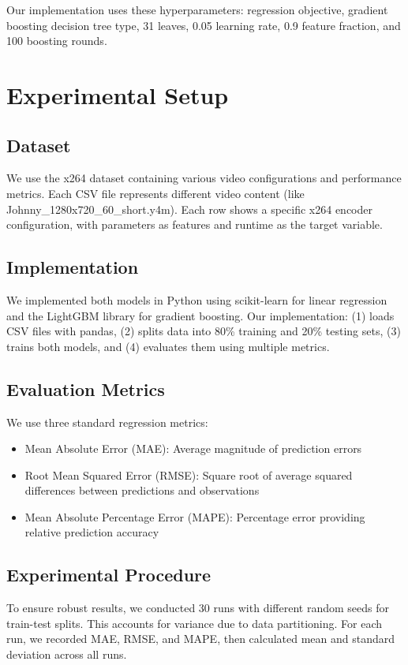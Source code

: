 \documentclass[10pt]{article}
\begin{document}
Our implementation uses these hyperparameters: regression objective, gradient boosting decision tree type, 31 leaves, 0.05 learning rate, 0.9 feature fraction, and 100 boosting rounds.

\section{Experimental Setup}
\subsection{Dataset}
We use the x264 dataset containing various video configurations and performance metrics. Each CSV file represents different video content (like Johnny\_1280x720\_60\_short.y4m). Each row shows a specific x264 encoder configuration, with parameters as features and runtime as the target variable.

\subsection{Implementation}
We implemented both models in Python using scikit-learn for linear regression and the LightGBM library for gradient boosting. Our implementation: (1) loads CSV files with pandas, (2) splits data into 80\% training and 20\% testing sets, (3) trains both models, and (4) evaluates them using multiple metrics.

\subsection{Evaluation Metrics}
We use three standard regression metrics:
\begin{itemize}
\item Mean Absolute Error (MAE): Average magnitude of prediction errors
\item Root Mean Squared Error (RMSE): Square root of average squared differences between predictions and observations
\item Mean Absolute Percentage Error (MAPE): Percentage error providing relative prediction accuracy
\end{itemize}

\subsection{Experimental Procedure}
To ensure robust results, we conducted 30 runs with different random seeds for train-test splits. This accounts for variance due to data partitioning. For each run, we recorded MAE, RMSE, and MAPE, then calculated mean and standard deviation across all runs.
\end{document}
